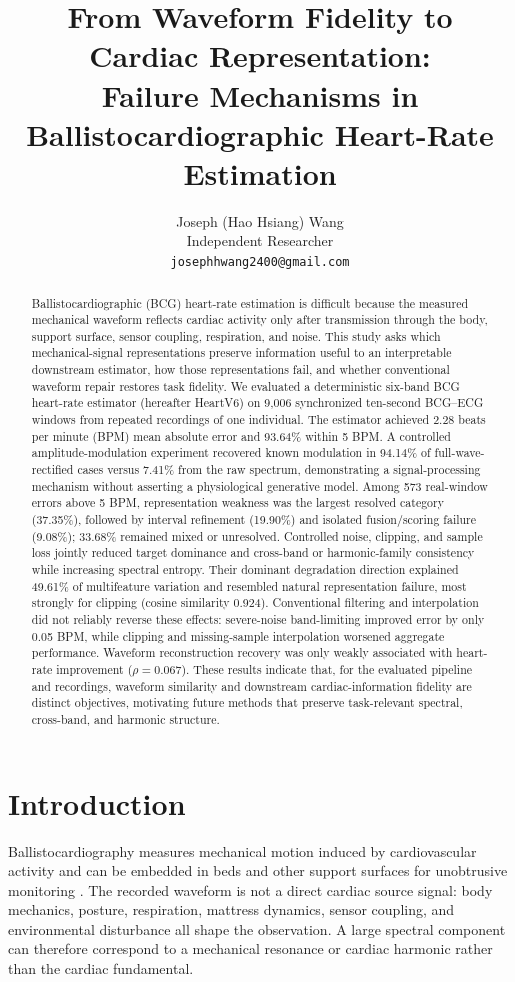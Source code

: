\documentclass[10pt,twocolumn]{article}
\title{From Waveform Fidelity to Cardiac Representation:\\
Failure Mechanisms in Ballistocardiographic Heart-Rate Estimation}
\author{Joseph (Hao Hsiang) Wang\\
\small Independent Researcher\\
\small \texttt{josephhwang2400@gmail.com}}
\date{}
\begin{document}
\maketitle

\begin{abstract}
Ballistocardiographic (BCG) heart-rate estimation is difficult because the measured mechanical waveform reflects cardiac activity only after transmission through the body, support surface, sensor coupling, respiration, and noise. This study asks which mechanical-signal representations preserve information useful to an interpretable downstream estimator, how those representations fail, and whether conventional waveform repair restores task fidelity. We evaluated a deterministic six-band BCG heart-rate estimator (hereafter HeartV6) on 9,006 synchronized ten-second BCG--ECG windows from repeated recordings of one individual. The estimator achieved 2.28 beats per minute (BPM) mean absolute error and 93.64\% within 5 BPM. A controlled amplitude-modulation experiment recovered known modulation in 94.14\% of full-wave-rectified cases versus 7.41\% from the raw spectrum, demonstrating a signal-processing mechanism without asserting a physiological generative model. Among 573 real-window errors above 5 BPM, representation weakness was the largest resolved category (37.35\%), followed by interval refinement (19.90\%) and isolated fusion/scoring failure (9.08\%); 33.68\% remained mixed or unresolved. Controlled noise, clipping, and sample loss jointly reduced target dominance and cross-band or harmonic-family consistency while increasing spectral entropy. Their dominant degradation direction explained 49.61\% of multifeature variation and resembled natural representation failure, most strongly for clipping (cosine similarity 0.924). Conventional filtering and interpolation did not reliably reverse these effects: severe-noise band-limiting improved error by only 0.05 BPM, while clipping and missing-sample interpolation worsened aggregate performance. Waveform reconstruction recovery was only weakly associated with heart-rate improvement ($\rho=0.067$). These results indicate that, for the evaluated pipeline and recordings, waveform similarity and downstream cardiac-information fidelity are distinct objectives, motivating future methods that preserve task-relevant spectral, cross-band, and harmonic structure.
\end{abstract}

\section{Introduction}
Ballistocardiography measures mechanical motion induced by cardiovascular activity and can be embedded in beds and other support surfaces for unobtrusive monitoring \cite{sadek2019review,qiu2025dataset}. The recorded waveform is not a direct cardiac source signal: body mechanics, posture, respiration, mattress dynamics, sensor coupling, and environmental disturbance all shape the observation. A large spectral component can therefore correspond to a mechanical resonance or cardiac harmonic rather than the cardiac fundamental.
\end{document}

